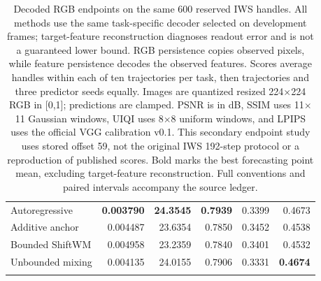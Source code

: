 \begin{table}[tbp]
\begin{tabular}{@{}lrrrrr@{}}
Autoregressive & \textbf{0.003790} & \textbf{24.3545} & \textbf{0.7939} & 0.3399 & 0.4673 \\
Additive anchor & 0.004487 & 23.6354 & 0.7850 & 0.3452 & 0.4538 \\
Bounded ShiftWM & 0.004958 & 23.2359 & 0.7840 & 0.3401 & 0.4532 \\
Unbounded mixing & 0.004135 & 24.0155 & 0.7906 & 0.3331 & \textbf{0.4674} \\
\addlinespace[2pt]
\bottomrule\end{tabular}\endgroup
\caption{Decoded RGB endpoints on the same 600 reserved IWS handles. All methods use the same task-specific decoder selected on development frames; target-feature reconstruction diagnoses readout error and is not a guaranteed lower bound. RGB persistence copies observed pixels, while feature persistence decodes the observed features. Scores average handles within each of ten trajectories per task, then trajectories and three predictor seeds equally. Images are quantized resized 224$\times$224 RGB in [0,1]; predictions are clamped. PSNR is in dB, SSIM uses 11$\times$11 Gaussian windows, UIQI uses 8$\times$8 uniform windows, and LPIPS uses the official VGG calibration v0.1. This secondary endpoint study uses stored offset 59, not the original IWS 192-step protocol or a reproduction of published scores. Bold marks the best forecasting point mean, excluding target-feature reconstruction. Full conventions and paired intervals accompany the source ledger.}
\label{tab:rgb-endpoint-comparison}\end{table}
